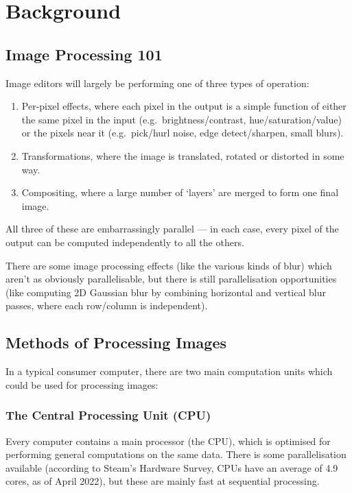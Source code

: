 \documentclass[12pt]{article}
\begin{document}
\pagebreak



\section{Background}

\subsection{Image Processing 101}

Image editors will largely be performing one of three types of operation:

\begin{enumerate}
    \item Per-pixel effects, where each pixel in the output is a simple function of either the same
        pixel in the input (e.g.\ brightness/contrast, hue/saturation/value) or the pixels near it
        (e.g.\ pick/hurl noise, edge detect/sharpen, small blurs).
    \item Transformations, where the image is translated, rotated or distorted in some way.
    \item Compositing, where a large number of `layers' are merged to form one final image.
\end{enumerate}

All three of these are embarrassingly parallel --- in each case, every pixel of the output can be
computed independently to all the others.

There are some image processing effects (like the various kinds of blur) which aren't as obviously
parallelisable, but there is still parallelisation opportunities (like computing 2D Gaussian blur by
combining horizontal and vertical blur passes, where each row/column is independent).



\subsection{Methods of Processing Images}

In a typical consumer computer, there are two main computation units which could be used for
processing images:

\subsubsection{The Central Processing Unit (CPU)}

Every computer contains a main processor (the CPU), which is optimised for performing general
computations on the same data.  There is some parallelisation available (according to Steam's
Hardware Survey, CPUs have an average of 4.9 cores, as of April 2022), but these are mainly fast at
sequential processing.
\end{document}
